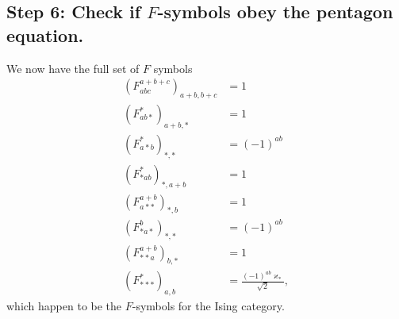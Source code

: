 \subsection*{Step 6: Check if $F$-symbols obey the pentagon equation.} 
We now have the full set of $F$ symbols
	\begin{align*}
		\left(F_{abc}^{a+b+c}\right)_{a+b,b+c}&=1\\
		\left(F_{ab*}^*\right)_{a+b,*}&=1\\
		\left(F_{a*b}^*\right)_{*,*}&=(-1)^{ab}\\
		\left(F_{*ab}^*\right)_{*,a+b}&=1\\
		\left(F_{a**}^{a+b}\right)_{*,b}&=1\\
		\left(F_{*a*}^b\right)_{*,*}&=(-1)^{ab}\\
		\left(F_{**a}^{a+b}\right)_{b,*}&=1\\
		\left(F_{***}^*\right)_{a,b}&=\frac{(-1)^{ab}\varkappa_*}{\sqrt{2}},
	\end{align*}
which happen to be the $F$-symbols for the Ising category. 
